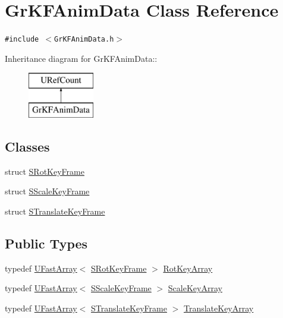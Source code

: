 \hypertarget{class_gr_k_f_anim_data}{
\section{GrKFAnimData Class Reference}
\label{class_gr_k_f_anim_data}
}
{\tt \#include $<$GrKFAnimData.h$>$}

Inheritance diagram for GrKFAnimData::\begin{figure}[H]
\begin{center}
\leavevmode
\includegraphics[height=2cm]{class_gr_k_f_anim_data}
\end{center}
\end{figure}
\subsection*{Classes}
\begin{CompactItemize}
\item 
struct \hyperlink{struct_gr_k_f_anim_data_1_1_s_rot_key_frame}{SRotKeyFrame}
\item 
struct \hyperlink{struct_gr_k_f_anim_data_1_1_s_scale_key_frame}{SScaleKeyFrame}
\item 
struct \hyperlink{struct_gr_k_f_anim_data_1_1_s_translate_key_frame}{STranslateKeyFrame}
\end{CompactItemize}
\subsection*{Public Types}
\begin{CompactItemize}
\item 
typedef \hyperlink{class_u_fast_array}{UFastArray}$<$ \hyperlink{struct_gr_k_f_anim_data_1_1_s_rot_key_frame}{SRotKeyFrame} $>$ \hyperlink{class_gr_k_f_anim_data_3ec7db018331bb9a3d0b8ced4f22859a}{RotKeyArray}
\item 
typedef \hyperlink{class_u_fast_array}{UFastArray}$<$ \hyperlink{struct_gr_k_f_anim_data_1_1_s_scale_key_frame}{SScaleKeyFrame} $>$ \hyperlink{class_gr_k_f_anim_data_60223633a25292285068192bd20f71dc}{ScaleKeyArray}
\item 
typedef \hyperlink{class_u_fast_array}{UFastArray}$<$ \hyperlink{struct_gr_k_f_anim_data_1_1_s_translate_key_frame}{STranslateKeyFrame} $>$ \hyperlink{class_gr_k_f_anim_data_38d6be96467bdb179c733bb1ed40d36f}{TranslateKeyArray}
\end{CompactItemize}
